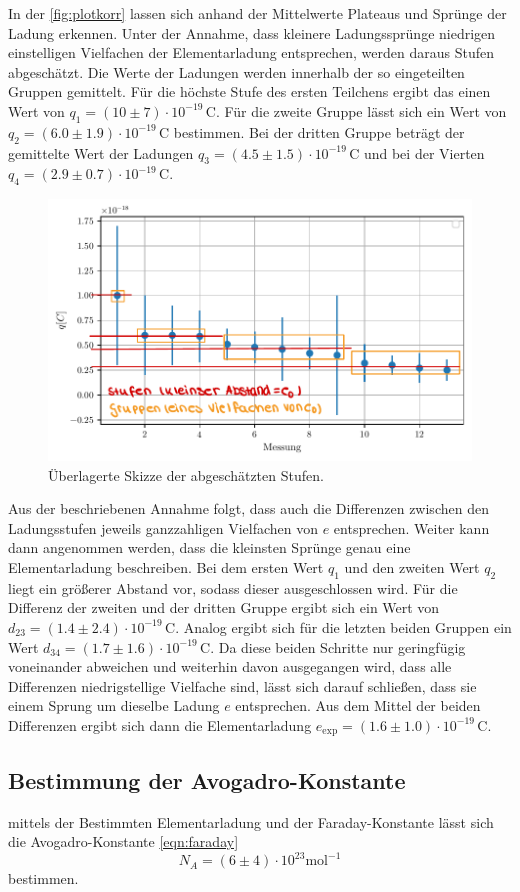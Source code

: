 In der \autoref{fig:plotkorr} lassen sich anhand der Mittelwerte Plateaus und Sprünge der Ladung erkennen. Unter der Annahme, dass
kleinere Ladungssprünge niedrigen einstelligen Vielfachen der Elementarladung entsprechen, werden daraus Stufen abgeschätzt.
Die Werte der Ladungen werden innerhalb der so eingeteilten Gruppen gemittelt. Für die höchste
Stufe des ersten Teilchens ergibt das einen Wert von $ q_1 = (10 \pm 7) \cdot 10^{-19} \, \mathrm{C}$. Für die zweite Gruppe
lässt sich ein Wert von $q_2 = (6.0 \pm 1.9) \cdot 10^{-19} \, \mathrm{C}$ bestimmen. Bei der dritten Gruppe beträgt der gemittelte 
Wert der Ladungen $q_3 = (4.5 \pm 1.5) \cdot 10^{-19} \, \mathrm{C}$ und bei der Vierten $q_4 = (2.9 \pm 0.7) \cdot 10^{-19} \, \mathrm{C}$.

\begin{figure}[H]
    \centering
    \includegraphics[width=0.75\linewidth]{content/grafik/plot1-korr.pdf}
    \caption{Überlagerte Skizze der abgeschätzten Stufen.}
    \label{fig:plotkorr}
\end{figure}

Aus der beschriebenen Annahme folgt, dass auch die Differenzen zwischen den Ladungsstufen jeweils ganzzahligen Vielfachen von $e$ entsprechen.
Weiter kann dann angenommen werden, dass die kleinsten Sprünge genau eine Elementarladung beschreiben. Bei dem ersten Wert $q_1$ und den zweiten
Wert $q_2$ liegt ein größerer Abstand vor, sodass dieser ausgeschlossen wird. Für die Differenz der zweiten und der dritten Gruppe ergibt sich ein
Wert von $d_{23} = (1.4 \pm 2.4) \cdot 10^{-19} \, \mathrm{C}$. Analog ergibt sich für die letzten beiden Gruppen ein Wert
$d_{34} = (1.7 \pm 1.6) \cdot 10^{-19} \, \mathrm{C}$. Da diese beiden Schritte nur geringfügig voneinander abweichen und weiterhin davon
ausgegangen wird, dass alle Differenzen niedrigstellige Vielfache sind, lässt sich darauf schließen, dass sie einem Sprung um dieselbe Ladung $e$
entsprechen. Aus dem Mittel der beiden Differenzen ergibt sich dann die Elementarladung $e_{\text{exp}} = (1.6 \pm 1.0) \cdot 10^{-19} \, \mathrm{C}$.

\subsection{Bestimmung der Avogadro-Konstante}
\label{sec:bestimmung der Avogadro-konstante}

mittels der Bestimmten Elementarladung und der Faraday-Konstante lässt sich die Avogadro-Konstante \eqref{eqn:faraday}
\begin{equation*} 
	N_{\! A} = (6 \pm 4) \cdot 10^{23} \mathrm{mol}^{-1}
\end{equation*}
bestimmen.
